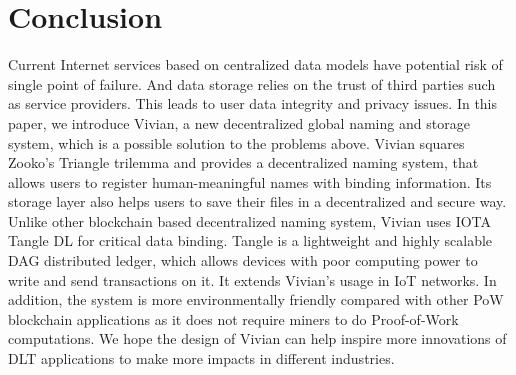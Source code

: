 \section{Conclusion}
\label{sec:conclusion}

Current Internet services based on centralized data models have potential risk of single point of failure. 
And data storage relies on the trust of third parties such as service providers. This leads to user data integrity and privacy issues.
In this paper, we introduce Vivian, a new decentralized global naming and storage system, which is a possible solution to the problems above.
Vivian squares Zooko's Triangle trilemma and provides a decentralized naming system, that allows users to register human-meaningful names with binding information.
Its storage layer also helps users to save their files in a decentralized and secure way. 
Unlike other blockchain based decentralized naming system, Vivian uses IOTA Tangle DL for critical data binding. 
Tangle is a lightweight and highly scalable DAG distributed ledger, which allows devices with poor computing power to write and send transactions on it.
It extends Vivian's usage in IoT networks.
In addition, the system is more environmentally friendly compared with other PoW blockchain applications as it does not require miners to do Proof-of-Work computations.
We hope the design of Vivian can help inspire more innovations of DLT applications to make more impacts in different industries.
